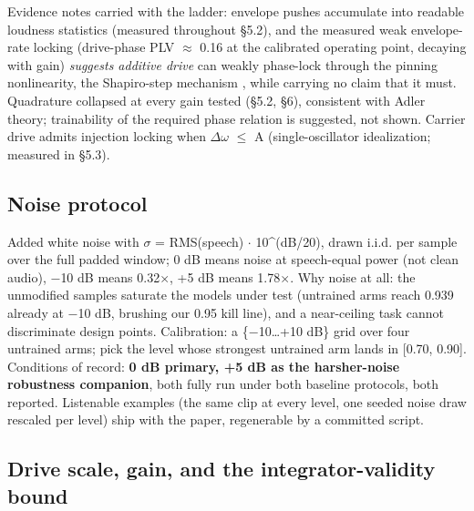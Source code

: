 \documentclass[10pt]{article}
\begin{document}
Evidence notes carried with the ladder: envelope pushes accumulate into
readable loudness statistics (measured throughout §5.2), and the
measured weak envelope-rate locking (drive-phase PLV
\ensuremath{\approx} 0.16 at the calibrated operating point, decaying
with gain) \emph{suggests additive drive} can weakly phase-lock through
the pinning nonlinearity, the Shapiro-step mechanism
\citep{pikovsky2001}, while carrying no claim that it must. Quadrature
collapsed at every gain tested (§5.2, §6), consistent with Adler theory;
trainability of the required phase relation is suggested, not shown.
Carrier drive admits injection locking when
\textbar{}\ensuremath{\Delta\omega}\textbar{} \ensuremath{\leq} A
(single-oscillator idealization; measured in §5.3).

\subsection{Noise protocol}\label{noise-protocol}

Added white noise with \ensuremath{\sigma} = RMS(speech)
\ensuremath{\cdot} 10\^{}(dB/20), drawn i.i.d. per sample over the full
padded window; 0 dB means noise at speech-equal power (not clean audio),
\ensuremath{-}10 dB means 0.32\ensuremath{\times}, +5 dB means
1.78\ensuremath{\times}. Why noise at all: the unmodified samples
saturate the models under test (untrained arms reach 0.939 already at
\ensuremath{-}10 dB, brushing our 0.95 kill line), and a near-ceiling
task cannot discriminate design points. Calibration: a
\{\ensuremath{-}10\ldots+10 dB\} grid over four untrained arms; pick the
level whose strongest untrained arm lands in {[}0.70, 0.90{]}.
Conditions of record: \textbf{0 dB primary, +5 dB as the harsher-noise
robustness companion}, both fully run under both baseline protocols,
both reported. Listenable examples (the same clip at every level, one
seeded noise draw rescaled per level) ship with the paper, regenerable
by a committed script.

\subsection{Drive scale, gain, and the integrator-validity
bound}\label{drive-scale-gain-and-the-integrator-validity-bound}
\end{document}
